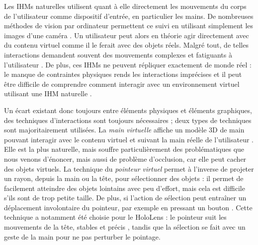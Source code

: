 
Les IHMs naturelles utilisent quant à elle directement les mouvements du corps de l'utilisateur comme dispositif d'entrée, en particulier les mains. De nombreuses méthodes de vision par ordinateur permettent ce suivi en utilisant simplement les images d'une caméra \citep{Billinghurst2015}. Un utilisateur peut alors en théorie agir directement avec du contenu virtuel comme il le ferait avec des objets réels. Malgré tout, de telles interactions demandent souvent des mouvements complexes et fatiguants à l'utilisateur \citep{Bowman2001}. De plus, ces IHMs ne peuvent répliquer exactement de monde réel : le manque de contraintes physiques rends les interactions imprécises \citep{Chan2010} et il peut être difficile de comprendre comment interagir avec un environnement virtuel utilisant une IHM naturelle \citep{Argelaguet2013}.


Un écart existant donc toujours entre éléments physiques et éléments graphiques, des techniques d'interactions sont toujours nécessaires ; deux types de techniques sont majoritairement utilisées. La \emph{main virtuelle} affiche un modèle 3D de main pouvant interagir avec le contenu virtuel et suivant la main réelle de l'utilisateur . Elle est la plus naturelle, mais souffre particulièrement des problématiques que nous venons d'énoncer, mais aussi de problème d'occlusion, car elle peut cacher des objets virtuels. La technique du \emph{pointeur virtuel} permet à l'inverse de projeter un rayon, depuis la main ou la tête, pour sélectionner des objets  : il permet de facilement atteindre des objets lointains avec peu d'effort, mais cela est difficile s'ils sont de trop petite taille. De plus, si l'action de sélection peut entraîner un déplacement involontaire du pointeur, par exemple en pressant un bouton \citep{Argelaguet2013}. Cette technique a notamment été choisie pour le HoloLens : le pointeur suit les mouvements de la tête, stables et précis \citep{Kitoe2018}, tandis que la sélection se fait avec un geste de la main pour ne pas perturber le pointage.

